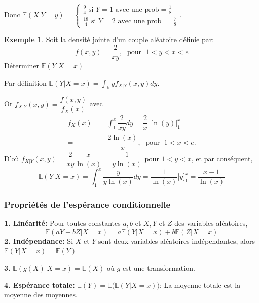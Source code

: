\documentclass[
]{book}
\theoremstyle{definition}
\theoremstyle{definition}
\newtheorem{example}{Exemple}[chapter]
\theoremstyle{definition}
\theoremstyle{remark}
\begin{document}
Donc \(\mathbb{E}\left( X|Y=y\right)= \begin{cases}  \frac{9}{4} \text{ si }Y=1 \text{ avec une prob} =\frac{1}{8}\\  \frac{18}{4} \text{ si } Y=2 \text{ avec une prob }=\frac{7}{8}  \end{cases}\).

\begin{example}
\protect\hypertarget{exm:unnamed-chunk-24}{}{\label{exm:unnamed-chunk-24} }Soit la densité jointe d'un couple aléatoire définie par: \[f(x,y)=\frac{2}{xy},\; \text{ pour }\;1<y<x<e \]
Déterminer \(\mathbb{E}\left( Y|X=x\right)\)
\end{example}

Par définition \(\mathbb{E}\left( Y|X=x\right)=\displaystyle \int_{\mathbb{R}}y{f}_{X|Y}(x,y)dy\).

Or \({f}_{X|Y}(x,y)=\dfrac{f(x,y)}{{f}_X(x)}\) avec
\begin{align*}
{f}_X(x)=&\int_1^x\dfrac{2}{xy}dy=\dfrac{2}{x}\biggl[\ln(y) \biggr]_1^x\\
=&\dfrac{2\ln(x)}{x},\;\text{ pour }\; 1<x<e.
\end{align*}
D'où \({f}_{X|Y}(x,y)=\dfrac{2}{xy}\dfrac{x}{\ln(x)}=\dfrac{1}{y\ln(x)}\) pour \(1<y<x\), et par conséquent,
\[ 
\mathbb{E}\left( Y|X=x\right)=\int_1^x \dfrac{y}{y\ln(x)}dy=\dfrac{1}{\ln(x)}\biggl[ y\biggr]_1^x=\dfrac{x-1}{\ln(x)}
\]

\hypertarget{propriuxe9tuxe9s-de-lespuxe9rance-conditionnelle}{%
\subsubsection*{Propriétés de l'espérance conditionnelle}\label{propriuxe9tuxe9s-de-lespuxe9rance-conditionnelle}}

\textbf{1. Linéarité:} Pour toutes constantes \(a,b\) et \(X,Y\) et \(Z\) des variables aléatoires,
\[\mathbb{E}\left(aY+bZ|X=x\right)=a \mathbb{E}\left(Y|X=x\right)+b\mathbb{E}\left(Z|X=x\right)\]
\textbf{2. Indépendance:} Si \(X\) et \(Y\) sont deux variables aléatoires indépendantes, alors \(\mathbb{E}\left(Y|X=x\right)=\mathbb{E}\left(Y\right)\)

\textbf{3.} \(\mathbb{E}\left(g(X)|X=x\right)=\mathbb{E}\left(X\right)\) où \(g\) est une transformation.

\textbf{4. Espérance totale:} \(\mathbb{E}\left(Y\right)=\mathbb{E}\bigl(\mathbb{E}\left(Y|X=x\right)\bigr)\): La moyenne totale est la moyenne des moyennes.
\end{document}
